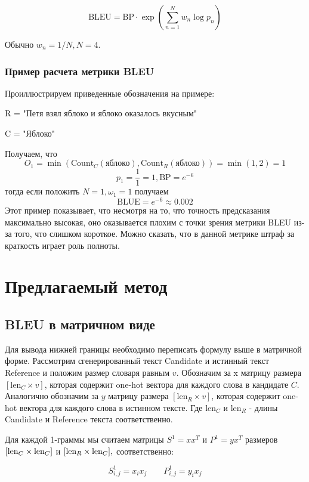 \documentclass[14pt, a4paper]{extarticle}
\begin{document}
\begin{equation}
\textrm{BLEU}=\textrm{BP} \cdot \exp \left(\sum\limits_{n=1}^N{w_n \log p_n}\right)
\end{equation}

Обычно $w_n = 1/N, N = 4$.


\subsubsection{Пример расчета метрики BLEU}

Проиллюстрируем приведенные обозначения на примере:

R = "Петя взял яблоко и яблоко оказалось вкусным"

C = "Яблоко"

Получаем, что $$O_1 = \min(\textrm{Count}_C(\textrm{яблоко}), \textrm{Count}_R(\textrm{яблоко})) = \min(1, 2) = 1$$
$$p_1 = \frac{1}{1} = 1, \textrm{BP} = e^{-6}$$ тогда если положить $N=1, \omega_1 = 1$ получаем
$$\textrm{BLUE} = e^{-6} \approx 0.002$$
Этот пример показывает, что несмотря на то, что точность предсказания максимально высокая, оно оказывается плохим с точки зрения метрики BLEU из-за того, что слишком короткое.
Можно сказать, что в данной метрике штраф за краткость играет роль полноты.
\section{Предлагаемый метод}
\subsection{BLEU в матричном виде}
Для вывода нижней границы необходимо переписать формулу выше в матричной форме. Рассмотрим сгенерированный текст Candidate и
истинный текст Reference и положим размер словаря равным $v$. Обозначим за
x матрицу размера $[\textrm{len}_C \times v]$, которая содержит one-hot вектора для
каждого слова в кандидате $C$. Аналогично обозначим за $y$ матрицу размера
$[\textrm{len}_R \times v]$, которая содержит one-hot вектора для каждого слова в
истинном тексте. Где $\textrm{len}_C$ и $\textrm{len}_R$ - длины Candidate и Reference текста соответственно.

Для каждой 1-граммы мы считаем матрицы  $S^{ 1}=xx^{T}$ и $P^{ 1}=yx^{T}$
размеров $\lbrack \textnormal{len$_C$} \times \textnormal{len$_C$} \rbrack$
и $ \lbrack \textnormal{len$_R$} \times \textnormal{len$_C$} \rbrack,$ соответственно:

$$
S^{ 1}_{i, j} = x_i x_j
\qquad
P^{ 1}_{i, j} = y_i x_j
$$
\end{document}
